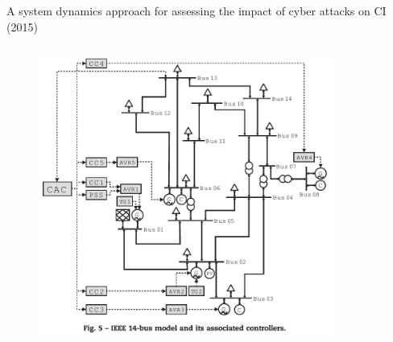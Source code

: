 \documentclass[compress]{beamer}
\begin{document}
\begin{frame}{A system dynamics approach for assessing the impact of cyber attacks on CI (2015)}
    \begin{columns}
     \begin{column}{0.55\textwidth}
      \begin{figure}
      \centering
      \includegraphics[width=1.0\textwidth]{./images/ieee-14-bus.png}
      \label{fig:ieee-14-bus-2}
      \end{figure}
     \end{column}
     \begin{column}{0.45\textwidth}
      \begin{figure}
      \centering

\end{figure}
\end{column}
\end{columns}
\end{frame}
\end{document}
